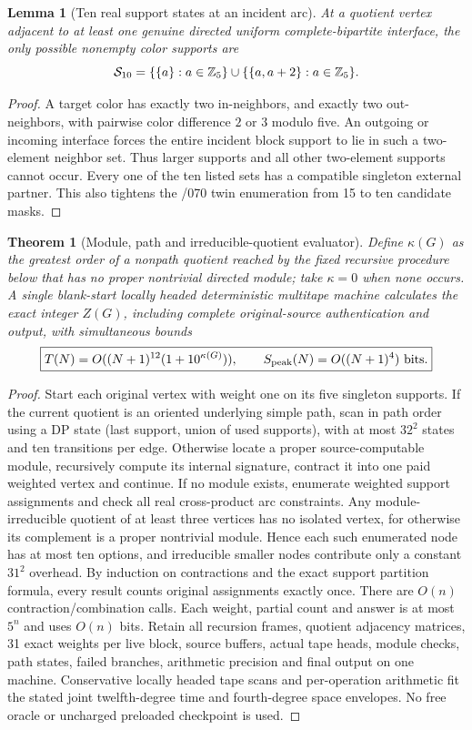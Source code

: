 \documentclass[11pt]{article}
\newtheorem{theorem}{Theorem}
\newtheorem{lemma}{Lemma}
\begin{document}
\begin{lemma}[Ten real support states at an incident arc]
At a quotient vertex adjacent to at least one genuine
directed uniform complete-bipartite interface, the only
possible nonempty color supports are
\[
 {\cal S}_{10}
 =\{\{a\}:a\in\mathbb Z_5\}
  \cup\{\{a,a+2\}:a\in\mathbb Z_5\}.
\]
\end{lemma}
\begin{proof}
A target color has exactly two in-neighbors, and exactly
two out-neighbors, with pairwise color difference $2$
or $3$ modulo five. An outgoing or incoming interface
forces the entire incident block support to lie in such
a two-element neighbor set. Thus larger supports and
all other two-element supports cannot occur. Every one
of the ten listed sets has a compatible singleton
external partner. This also tightens the /070 twin
enumeration from 15 to ten candidate masks.
\end{proof}

\begin{theorem}[Module, path and irreducible-quotient evaluator]
Define $\kappa(G)$ as the greatest order of a nonpath
quotient reached by the fixed recursive procedure below
that has no proper nontrivial directed module; take
$\kappa=0$ when none occurs. A single blank-start locally
headed deterministic multitape machine calculates the
exact integer $Z(G)$, including complete original-source
authentication and output, with simultaneous bounds
\[
 \boxed{T(N)=O((N+1)^{12}(1+10^{\kappa(G)})),
 \qquad S_{\rm peak}(N)=O((N+1)^4)\ {\rm bits}.}
\]
\end{theorem}
\begin{proof}
Start each original vertex with weight one on its five
singleton supports. If the current quotient is an
oriented underlying simple path, scan in path order using
a DP state (last support, union of used supports), with
at most $32^2$ states and ten transitions per edge.
Otherwise locate a proper source-computable module,
recursively compute its internal signature, contract it
into one paid weighted vertex and continue. If no
module exists, enumerate weighted support assignments
and check all real cross-product arc constraints.
Any module-irreducible quotient of at least three
vertices has no isolated vertex, for otherwise its
complement is a proper nontrivial module. Hence each
such enumerated node has at most ten options, and
irreducible smaller nodes contribute only a constant
$31^2$ overhead. By induction on contractions and
the exact support partition formula, every result
counts original assignments exactly once.
There are $O(n)$ contraction/combination calls.
Each weight, partial count and answer is at most
$5^n$ and uses $O(n)$ bits. Retain all recursion
frames, quotient adjacency matrices, 31 exact
weights per live block, source buffers, actual
tape heads, module checks, path states, failed
branches, arithmetic precision and final output
on one machine. Conservative locally headed tape
scans and per-operation arithmetic fit the stated
joint twelfth-degree time and fourth-degree space
envelopes. No free oracle or uncharged preloaded
checkpoint is used.
\end{proof}
\end{document}
